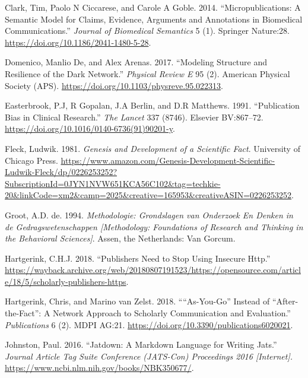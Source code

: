 \documentclass[a4paper]{article}
\begin{document}
\leavevmode\hypertarget{ref-doi:10.1186ux2f2041-1480-5-28}{}%
Clark, Tim, Paolo N Ciccarese, and Carole A Goble. 2014.
``Micropublications: A Semantic Model for Claims, Evidence, Arguments
and Annotations in Biomedical Communications.'' \emph{Journal of
Biomedical Semantics} 5 (1). Springer Nature:28.
\url{https://doi.org/10.1186/2041-1480-5-28}.

\leavevmode\hypertarget{ref-doi:10.1103ux2fphysreve.95.022313}{}%
Domenico, Manlio De, and Alex Arenas. 2017. ``Modeling Structure and
Resilience of the Dark Network.'' \emph{Physical Review E} 95 (2).
American Physical Society (APS).
\url{https://doi.org/10.1103/physreve.95.022313}.

\leavevmode\hypertarget{ref-doi:10.1016ux2f0140-6736_91_90201-y}{}%
Easterbrook, P.J, R Gopalan, J.A Berlin, and D.R Matthews. 1991.
``Publication Bias in Clinical Research.'' \emph{The Lancet} 337 (8746).
Elsevier BV:867--72. \url{https://doi.org/10.1016/0140-6736(91)90201-y}.

\leavevmode\hypertarget{ref-isbn:9780226253251}{}%
Fleck, Ludwik. 1981. \emph{Genesis and Development of a Scientific
Fact}. University of Chicago Press.
\url{https://www.amazon.com/Genesis-Development-Scientific-Ludwik-Fleck/dp/0226253252?SubscriptionId=0JYN1NVW651KCA56C102\&tag=techkie-20\&linkCode=xm2\&camp=2025\&creative=165953\&creativeASIN=0226253252}.

\leavevmode\hypertarget{ref-isbn:9789023228912}{}%
Groot, A.D. de. 1994. \emph{Methodologie: Grondslagen van Onderzoek En
Denken in de Gedragswetenschappen {[}Methodology: Foundations of
Research and Thinking in the Behavioral Sciences{]}}. Assen, the
Netherlands: Van Gorcum.

\leavevmode\hypertarget{ref-https-hartgerink}{}%
Hartgerink, C.H.J. 2018. ``Publishers Need to Stop Using Insecure
Http.''
\url{https://wayback.archive.org/web/20180807191523/https://opensource.com/article/18/5/scholarly-publishers-https}.

\leavevmode\hypertarget{ref-doi:10.3390ux2fpublications6020021}{}%
Hartgerink, Chris, and Marino van Zelst. 2018. ````As-You-Go'' Instead
of ``After-the-Fact'': A Network Approach to Scholarly Communication and
Evaluation.'' \emph{Publications} 6 (2). MDPI AG:21.
\url{https://doi.org/10.3390/publications6020021}.

\leavevmode\hypertarget{ref-jatdown}{}%
Johnston, Paul. 2016. ``Jatdown: A Markdown Language for Writing Jats.''
\emph{Journal Article Tag Suite Conference (JATS-Con) Proceedings 2016
{[}Internet{]}.} \url{https://www.ncbi.nlm.nih.gov/books/NBK350677/}.
\end{document}

